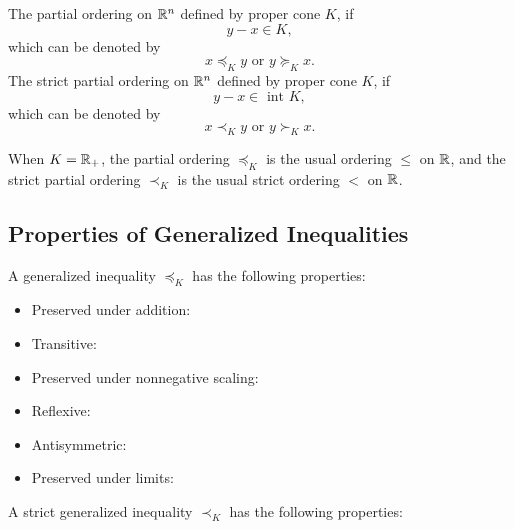 \begin{definition} \label{def:generalized-inequalities}
	The partial ordering on ${\mathbb R}^n$ defined by proper cone $K$, if
	\begin{equation}
		y-x\in K,
	\end{equation}
	which can be denoted by
	\begin{equation}
		x\preceq_{K}y\text{ or }y\succeq_{K}x.
	\end{equation}
	The strict partial ordering on ${\mathbb R}^n$ defined by proper cone $K$, if
	\begin{equation}
		y-x\in\text{ int }K,
	\end{equation}
	which can be denoted by
	\begin{equation}
		x\prec_{K}y\text{ or }y\succ_{K}x.
	\end{equation}
\end{definition}

\begin{remark}
	When $K={\mathbb R}_{+}$, the partial ordering $\preceq_{K}$ is the usual ordering $\leq$ on ${\mathbb R}$, and the strict partial ordering $\prec_{K}$ is the usual strict ordering $<$ on ${\mathbb R}$.
\end{remark}

\subsection{Properties of Generalized Inequalities}

\begin{theorem}
	A generalized inequality $\preceq_{K}$ has the following properties:
	\begin{itemize}
		\item Preserved under addition:
		\item Transitive:
		\item Preserved under nonnegative  scaling:
		\item Reflexive:
		\item Antisymmetric:
		\item Preserved under limits:
	\end{itemize}
	A strict generalized inequality $\prec_{K}$ has the following properties:
\end{theorem}
